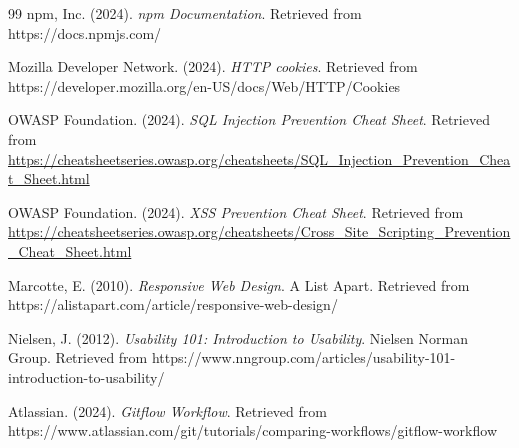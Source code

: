 \begin{thebibliography}{99}
npm, Inc. (2024). \textit{npm Documentation}. Retrieved from https://docs.npmjs.com/

Mozilla Developer Network. (2024). \textit{HTTP cookies}. Retrieved from https://developer.mozilla.org/en-US/docs/Web/HTTP/Cookies

OWASP Foundation. (2024). \textit{SQL Injection Prevention Cheat Sheet}. Retrieved from \url{https://cheatsheetseries.owasp.org/cheatsheets/SQL_Injection_Prevention_Cheat_Sheet.html}

OWASP Foundation. (2024). \textit{XSS Prevention Cheat Sheet}. Retrieved from \url{https://cheatsheetseries.owasp.org/cheatsheets/Cross_Site_Scripting_Prevention_Cheat_Sheet.html}

Marcotte, E. (2010). \textit{Responsive Web Design}. A List Apart. Retrieved from https://alistapart.com/article/responsive-web-design/

Nielsen, J. (2012). \textit{Usability 101: Introduction to Usability}. Nielsen Norman Group. Retrieved from https://www.nngroup.com/articles/usability-101-introduction-to-usability/

Atlassian. (2024). \textit{Gitflow Workflow}. Retrieved from https://www.atlassian.com/git/tutorials/comparing-workflows/gitflow-workflow

\end{thebibliography}